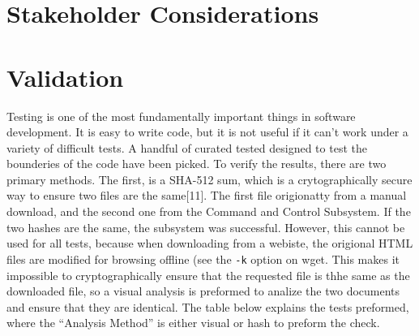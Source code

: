 \documentclass{article}
\begin{document}
\section{Stakeholder Considerations}

\section{Validation}

Testing is one of the most fundamentally important things in software
development. It is easy to write code, but it is not useful if it
can't work under a variety of difficult tests. A handful of curated
tested designed to test the bounderies of the code have been
picked. To verify the results, there are two primary methods. The
first, is a SHA-512 sum, which is a crytographically secure way to
ensure two files are the same[11]. The first file origionatty from a
manual download, and the second one from the Command and Control
Subsystem. If the two hashes are the same, the subsystem was
successful. However, this cannot be used for all
tests, because when downloading from a webiste, the origional HTML files
are modified for browsing offline (see the \texttt{-k} option on
wget. This makes it impossible to cryptographically ensure that the
requested file is thhe same as the downloaded file, so a visual
analysis is preformed to analize the two documents and ensure that
they are identical. The table below explains the tests preformed,
where the ``Analysis Method'' is either visual or hash to preform the
check. 
\end{document}
